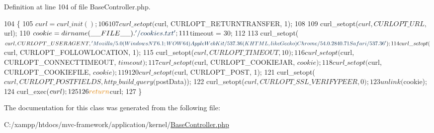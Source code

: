 Definition at line 104 of file Base\+Controller.\+php.


\begin{DoxyCode}
104                                                 \{
105         $curl = curl\_init();
106 
107         curl\_setopt($curl, CURLOPT\_RETURNTRANSFER, 1); 
108 
109         curl\_setopt($curl, CURLOPT\_URL, $url);
110         $cookie = dirname(\_\_FILE\_\_) . \textcolor{stringliteral}{'/cookies.txt'};
111         $timeout = 30;
112 
113         curl\_setopt($curl, CURLOPT\_USERAGENT, \textcolor{stringliteral}{'Mozilla/5.0 (Windows NT 6.1; WOW64) AppleWebKit/537.36
       (KHTML, like Gecko) Chrome/54.0.2840.71 Safari/537.36'});
114         curl\_setopt($curl, CURLOPT\_FOLLOWLOCATION, 1);
115         curl\_setopt($curl, CURLOPT\_TIMEOUT, 10); 
116         curl\_setopt($curl, CURLOPT\_CONNECTTIMEOUT, $timeout);
117         curl\_setopt($curl, CURLOPT\_COOKIEJAR, $cookie);
118         curl\_setopt($curl, CURLOPT\_COOKIEFILE, $cookie);
119 
120         curl\_setopt($curl, CURLOPT\_POST, 1); 
121         curl\_setopt($curl, CURLOPT\_POSTFIELDS, http\_build\_query($postData));     
122         curl\_setopt($curl, CURLOPT\_SSL\_VERIFYPEER, 0);
123         unlink($cookie);
124         curl\_exec($curl);
125 
126         \textcolor{keywordflow}{return} $curl;
127     \}
\end{DoxyCode}


The documentation for this class was generated from the following file\+:\begin{DoxyCompactItemize}
\item 
C\+:/xampp/htdocs/mvc-\/framework/application/kernel/\hyperlink{_base_controller_8php}{Base\+Controller.\+php}\end{DoxyCompactItemize}
